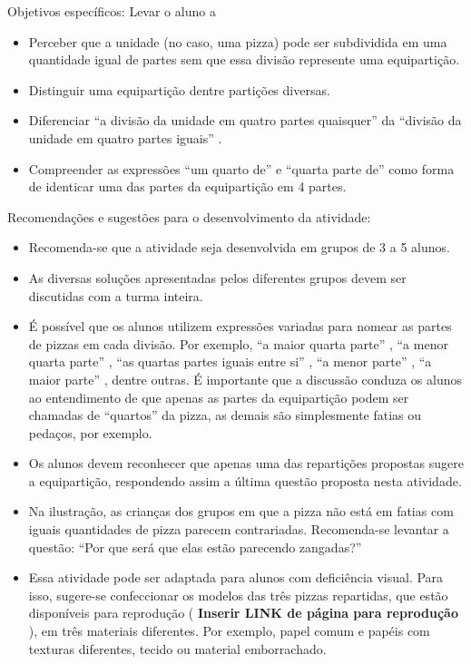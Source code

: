 \documentclass[a4paper,12pt,twoside]{book}
\begin{document}
\begin{professor*}[breakable]{}{}  
  
  Objetivos específicos: Levar o aluno a  
  
\begin{itemize} %
    \item       Perceber que a unidade (no caso, uma pizza) pode ser subdividida em uma quantidade igual de partes sem que essa divisão represente uma equipartição.
    \item       Distinguir uma equipartição dentre partições diversas.
    \item       Diferenciar       ``a divisão da unidade em quatro partes quaisquer''       da       ``divisão da unidade em quatro partes iguais''      . 
    \item       Compreender as expressões       ``um quarto de''       e       ``quarta parte de''       como forma de identicar uma das partes da equipartição em 4 partes. 
\end{itemize} %
  
  
  Recomendações e sugestões para o desenvolvimento da atividade:  
     
\begin{itemize} %
    \item       Recomenda-se que a atividade seja desenvolvida em grupos de 3 a 5 alunos.
    \item       As diversas soluções apresentadas pelos diferentes grupos devem ser discutidas com a turma inteira. 
    \item       É possível que os alunos utilizem expressões variadas para nomear as partes de pizzas em cada divisão. Por exemplo,       ``a maior quarta parte''      ,       ``a menor quarta parte''      ,       ``as quartas partes iguais entre si''      ,       ``a menor parte''      ,       ``a maior parte''      , dentre outras. É importante que a discussão conduza os alunos ao entendimento de que apenas as partes da equipartição podem ser chamadas de       ``quartos''       da pizza, as demais são simplesmente fatias ou pedaços, por exemplo. 
    \item       Os alunos devem reconhecer que apenas uma das repartições propostas sugere a equipartição, respondendo assim a última questão proposta nesta atividade.
    \item       Na ilustração, as crianças dos grupos em que a pizza não está em fatias com iguais quantidades de pizza parecem contrariadas. Recomenda-se levantar a questão:       ``Por que será que elas estão parecendo zangadas?''
    \item       Essa atividade pode ser adaptada para alunos com deficiência visual. Para isso, sugere-se confeccionar os modelos das três pizzas repartidas, que estão disponíveis para reprodução (      {\bf Inserir LINK de página para reprodução}      ), em três materiais diferentes. Por exemplo, papel comum e papéis com texturas diferentes, tecido ou material emborrachado. 
\end{itemize} %
  

\end{professor*}
\end{document}
